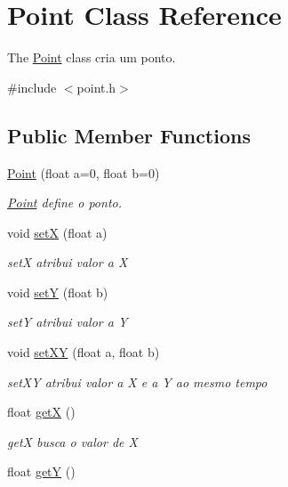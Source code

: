 \hypertarget{classPoint}{}\section{Point Class Reference}
\label{classPoint}


The \hyperlink{classPoint}{Point} class cria um ponto.  




{\ttfamily \#include $<$point.\+h$>$}

\subsection*{Public Member Functions}
\begin{DoxyCompactItemize}
\item 
\hyperlink{classPoint_abc1b6383cff5f5bbbd95a3a8c24db083}{Point} (float a=0, float b=0)
\begin{DoxyCompactList}\small\item\em \hyperlink{classPoint}{Point} define o ponto. \end{DoxyCompactList}\item 
void \hyperlink{classPoint_aede263d1e6993fbbd01c4fc9044e60f6}{setX} (float a)
\begin{DoxyCompactList}\small\item\em setX atribui valor a X \end{DoxyCompactList}\item 
void \hyperlink{classPoint_a88d5f63bca3913b0a8a1925db6288f7f}{setY} (float b)
\begin{DoxyCompactList}\small\item\em setY atribui valor a Y \end{DoxyCompactList}\item 
void \hyperlink{classPoint_a8a9b158cd152ed9b46778c2ae2bfc22a}{set\+XY} (float a, float b)
\begin{DoxyCompactList}\small\item\em set\+XY atribui valor a X e a Y ao mesmo tempo \end{DoxyCompactList}\item 
float \hyperlink{classPoint_acc27466778cc87a662bba40268c4c0c8}{getX} ()
\begin{DoxyCompactList}\small\item\em getX busca o valor de X \end{DoxyCompactList}\item 
float \hyperlink{classPoint_a3cccbca94719ddde353cce86ce0e2f64}{getY} ()

\end{DoxyCompactItemize}
